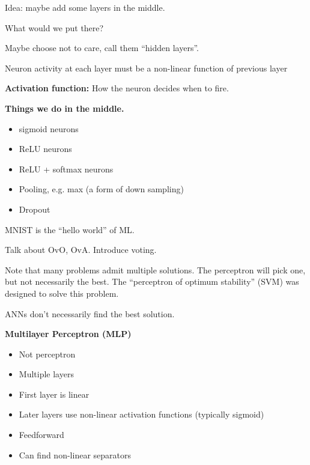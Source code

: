 
Idea: maybe add some layers in the middle.

What would we put there?

Maybe choose not to care, call them ``hidden layers''.

Neuron activity at each layer must be a non-linear function of
previous layer



\bigskip
\textbf{Activation function:} How the neuron decides when to fire.

\bigskip
\textbf{Things we do in the middle.}
\begin{itemize}
\item sigmoid neurons
\item ReLU neurons
\item ReLU + softmax neurons
\item Pooling, e.g. max (a form of down sampling)
\item Dropout
\end{itemize}




MNIST is the ``hello world'' of ML.

Talk about OvO, OvA.  Introduce voting.

Note that many problems admit multiple solutions.  The perceptron will
pick one, but not necessarily the best.  The ``perceptron of optimum
stability'' (SVM) was designed to solve this problem.

ANNs don't necessarily find the best solution.

\textbf{Multilayer Perceptron (MLP)}
\begin{itemize}
\item Not perceptron
\item Multiple layers
\item First layer is linear
\item Later layers use non-linear activation functions (typically sigmoid)
\item Feedforward
\item Can find non-linear separators
\end{itemize}

